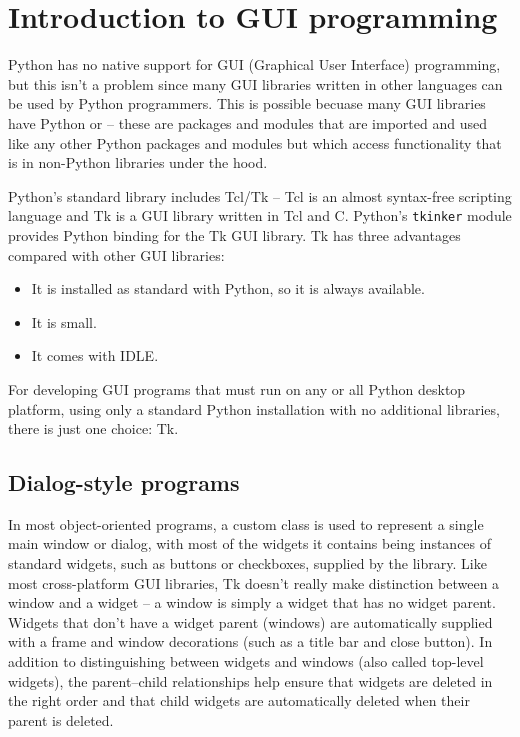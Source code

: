 
\chapter{Introduction to GUI programming}

Python has no native support for GUI (Graphical User Interface) programming, but this isn't a problem since many GUI libraries written in other languages can be used by Python programmers.
This is possible becuase many GUI libraries have Python  or  -- these are packages and modules that are imported and used like any other Python packages and modules but which access functionality that is in non-Python libraries under the hood.


Python's standard library includes Tcl/Tk -- Tcl is an almost syntax-free scripting language and Tk is a GUI library written in Tcl and C.
Python's \verb|tkinker| module provides Python binding for the Tk GUI library.
Tk has three advantages compared with other GUI libraries:
\begin{itemize}
\item It is installed as standard with Python, so it is always available.
\item It is small.
\item It comes with IDLE.
\end{itemize}



For developing GUI programs that must run on any or all Python desktop platform, using only a standard Python installation with no additional libraries, there is just one choice: Tk.



\section{Dialog-style programs}

In most object-oriented programs, a custom class is used to represent a single main window or dialog, with most of the widgets it contains being instances of standard widgets, such as buttons or checkboxes, supplied by the library.
Like most cross-platform GUI libraries, Tk doesn't really make distinction between a window and a widget -- a window is simply a widget that has no widget parent.
Widgets that don't have a widget parent (windows) are automatically supplied with a frame and window decorations (such as a title bar and close button).
In addition to distinguishing between widgets and windows (also called top-level widgets), the parent–child relationships help ensure that widgets are deleted in the right order and that child widgets are automatically deleted when their parent is deleted.

